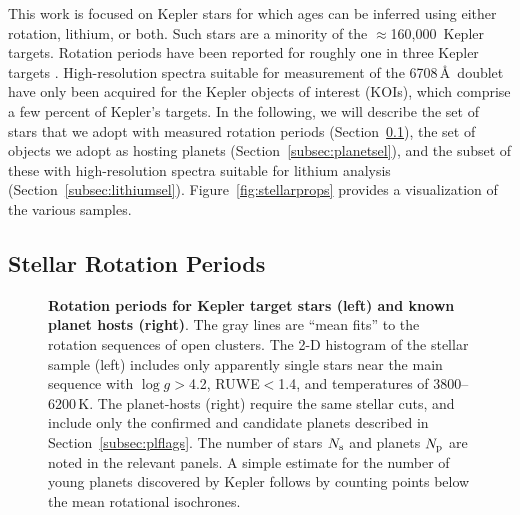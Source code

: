 \documentclass[11pt,twocolumn,tighten,linenumbers]{aastex63}
\newcommand{\nkeplerstars}{$\approx$160{,}000}
\begin{document}
This work is focused on Kepler stars for which ages can be inferred
using either rotation, lithium, or both.  Such stars are a minority of
the \nkeplerstars\ Kepler targets.  Rotation periods have been
reported for roughly one in three Kepler targets
\citep[e.g.][]{McQuillan_2014,Santos_2021}.  High-resolution spectra
suitable for measurement of the  6708\,\AA\ doublet have
only been acquired for the Kepler objects of interest (KOIs), which
comprise a few percent of Kepler's targets.  In the following, we will
describe the set of stars that we adopt with measured rotation periods
(Section~\ref{subsec:rotsel}), the set of objects we adopt as hosting
planets (Section~\ref{subsec:planetsel}), and the subset of these with
high-resolution spectra suitable for lithium analysis
(Section~\ref{subsec:lithiumsel}).  Figure~\ref{fig:stellarprops}
provides a visualization of the various samples.


\subsection{Stellar Rotation Periods}
\label{subsec:rotsel}


\begin{figure}[!t]
	\begin{center}
	\end{center}
	\vspace{-0.5cm}
	\caption{
    {\bf Rotation periods for Kepler target stars (left) and known
    planet hosts (right)}.  The gray lines are ``mean fits'' to the
    rotation sequences of open clusters.  The 2-D histogram of the
    stellar sample (left) includes only apparently single stars near
    the main sequence with $\log g$$>$4.2, RUWE$<$1.4, and
    temperatures of 3800--6200\,K.  The planet-hosts (right) require
    the same stellar cuts, and include only the confirmed and
    candidate planets described in Section~\ref{subsec:plflags}.  The
    number of stars $N_{\rm s}$ and planets $N_{\rm p}$ are noted in
    the relevant panels.  A simple estimate for the number of young
    planets discovered by Kepler follows by counting points below the
    mean rotational isochrones.
	}
	\label{fig:prot_vs_teff}
\end{figure}
\end{document}
